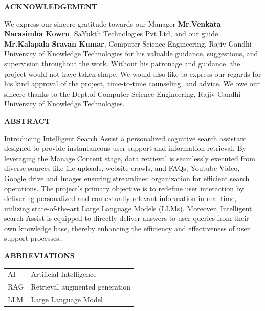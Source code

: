\documentclass[12pt,a4paper,oneside]{report}
\begin{document}
\thispagestyle{empty}
\vspace*{3cm}
\begin{center}  {\large \bf ACKNOWLEDGEMENT}\end{center}
\vspace{1cm}
\hspace{1cm}We express our sincere gratitude towards our Manager \textbf{Mr.Venkata Narasimha Kowru}, SaYukth Technologies Pvt Ltd, and our guide \textbf{Mr.Kalapala Sravan Kumar},
Computer Science Engineering, Rajiv Gandhi University of Knowledge Technologies for his valuable guidance, suggestions, and supervision throughout the work. Without his patronage and guidance, the project would not have taken shape. We would also like to express our regards for his kind approval of the project, time-to-time counseling, and advice. We owe our sincere thanks to the Dept.of Computer Science Engineering, Rajiv Gandhi University of Knowledge Technologies. 
\newpage
\vspace*{2cm}
\begin{center}  {\Large \bf ABSTRACT}\end{center}
\vspace{1cm}
\noindent 
\hspace{1cm}
Introducing Intelligent  Search Assist a personalized cognitive search assistant designed to provide instantaneous user support and information retrieval. By leveraging the Manage Content stage, data retrieval is seamlessly executed from diverse sources like file uploads, website crawls, and FAQs, Youtube Video, Google drive and Images ensuring streamlined organization for efficient search operations. The project's primary objective is to redefine user interaction by delivering personalized and contextually relevant information in real-time, utilizing state-of-the-art Large Language Models (LLMs). Moreover, Intelligent search Assist is equipped to directly deliver answers to user queries from their own knowledge base, thereby enhancing the efficiency and effectiveness of user support processes..


\newpage
\thispagestyle{empty}

\newpage
\tableofcontents 	
\cleardoublepage 

\listoffigures 	\cleardoublepage

\newpage
\begin{center}  {\Large \bf ABBREVIATIONS}\end{center}
\vspace{1cm}\doublespacing
\begin{tabular}{l l}

AI & Artificial Intelligence \\
RAG & Retrieval augmented generation  \\
LLM & Large Language Model \\


\end{tabular} 
\end{document}
